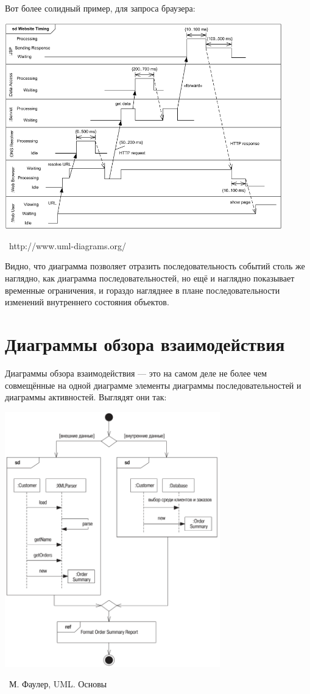 \documentclass[a5paper]{article}
\newcommand{\attribution}[1] {
	\vspace{-5mm}\begin{flushright}\begin{scriptsize}%
	{\textcopyright\, #1}\end{scriptsize}\end{flushright}
}
\begin{document}
Вот более солидный пример, для запроса браузера:

\begin{center}
	\includegraphics[width=0.9\textwidth]{timingDiagramExample.png}
	\attribution{http://www.uml-diagrams.org/}
\end{center}

Видно, что диаграмма позволяет отразить последовательность событий столь же наглядно, как диаграмма последовательностей, но ещё и наглядно показывает временные ограничения, и гораздо нагляднее в плане последовательности изменений внутреннего состояния объектов.

\section{Диаграммы обзора взаимодействия}

Диаграммы обзора взаимодействия --- это на самом деле не более чем совмещённые на одной диаграмме элементы диаграммы последовательностей и диаграммы активностей. Выглядят они так:

\begin{center}
	\includegraphics[width=0.7\textwidth]{interactionOverviewDiagrams.png}
	\attribution{М. Фаулер, UML. Основы}
\end{center}
\end{document}
